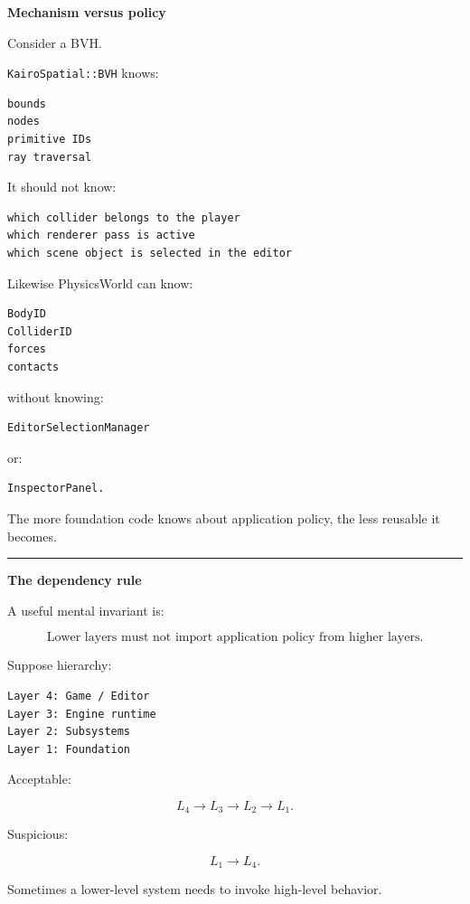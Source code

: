 \textbf{Mechanism versus policy}

Consider a BVH.

\texttt{KairoSpatial::BVH} knows:

\begin{verbatim}
bounds
nodes
primitive IDs
ray traversal
\end{verbatim}

It should not know:

\begin{verbatim}
which collider belongs to the player
which renderer pass is active
which scene object is selected in the editor
\end{verbatim}

Likewise PhysicsWorld can know:

\begin{verbatim}
BodyID
ColliderID
forces
contacts
\end{verbatim}

without knowing:

\begin{verbatim}
EditorSelectionManager
\end{verbatim}

or:

\begin{verbatim}
InspectorPanel.
\end{verbatim}

The more foundation code knows about application policy, the less reusable it becomes.

\begin{center}\rule{0.5\linewidth}{0.5pt}\end{center}

\textbf{The dependency rule}

A useful mental invariant is:

\[
\boxed{
\text{Lower layers must not import application policy from higher layers.}
}
\]

Suppose hierarchy:

\begin{verbatim}
Layer 4: Game / Editor
Layer 3: Engine runtime
Layer 2: Subsystems
Layer 1: Foundation
\end{verbatim}

Acceptable:

\[
L_4\rightarrow L_3\rightarrow L_2\rightarrow L_1.
\]

Suspicious:

\[
L_1\rightarrow L_4.
\]

Sometimes a lower-level system needs to invoke high-level behavior.

